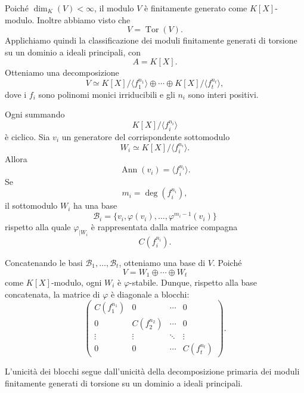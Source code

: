\documentclass[a4paper]{article}
\begin{document}
\begin{radioactive}
\begin{snippetproof}{}
    Poiché \(\dim_K(V)<\infty\), il modulo \(V\) è finitamente generato come \(K[X]\)-modulo. Inoltre abbiamo visto che
    \[
        V=\operatorname{Tor}(V).
    \]
    Applichiamo quindi la classificazione dei moduli finitamente generati di torsione su un dominio a ideali principali, con
    \[
        A=K[X].
    \]
    Otteniamo una decomposizione
    \[
        V\simeq
        K[X]/\langle f_1^{n_1} \rangle
        \oplus\cdots\oplus
        K[X]/\langle f_t^{n_t} \rangle,
    \]
    dove i \(f_i\) sono polinomi monici irriducibili e gli \(n_i\) sono interi positivi.

    Ogni summando
    \[
        K[X]/\langle f_i^{n_i} \rangle
    \]
    è ciclico. Sia \(v_i\) un generatore del corrispondente sottomodulo
    \[
        W_i\simeq K[X]/\langle f_i^{n_i} \rangle.
    \]
    Allora
    \[
        \operatorname{Ann}(v_i)=\langle f_i^{n_i} \rangle.
    \]
    Se
    \[
        m_i=\deg(f_i^{n_i}),
    \]
    il sottomodulo \(W_i\) ha una base
    \[
        \mathcal{B}_i
        =
        \{v_i,\varphi(v_i),\ldots,\varphi^{m_i-1}(v_i)\}
    \]
    rispetto alla quale \(\varphi_{|W_i}\) è rappresentata dalla matrice compagna
    \[
        C(f_i^{n_i}).
    \]

    Concatenando le basi \(\mathcal{B}_1,\ldots,\mathcal{B}_t\), otteniamo una base di \(V\). Poiché
    \[
        V=W_1\oplus\cdots\oplus W_t
    \]
    come \(K[X]\)-modulo, ogni \(W_i\) è \(\varphi\)-stabile. Dunque, rispetto alla base concatenata, la matrice di \(\varphi\) è diagonale a blocchi:
    \[
        \begin{pmatrix}
            C(f_1^{n_1}) & 0 & \cdots & 0\\
            0 & C(f_2^{n_2}) & \cdots & 0\\
            \vdots & \vdots & \ddots & \vdots\\
            0 & 0 & \cdots & C(f_t^{n_t})
        \end{pmatrix}.
    \]

    L'unicità dei blocchi segue dall'unicità della decomposizione primaria dei moduli finitamente generati di torsione su un dominio a ideali principali.
\end{snippetproof}
\end{radioactive}
\end{document}
